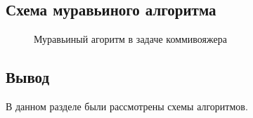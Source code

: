 \documentclass[a4paper, 14pt]{article}
\begin{document}
        \subsection{Схема муравьиного алгоритма}\label{vstad}
        \begin{figure}[h]
        	\caption{Муравьиный агоритм в задаче коммивояжера}
        	\label{fig:ant}
        \end{figure}
        \newpage   
       
            
		
\subsection{Вывод}
	В данном разделе были рассмотрены схемы алгоритмов.
	\newpage
\end{document}
